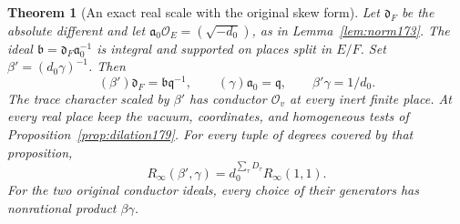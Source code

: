 \documentclass[a4paper,11pt]{article}
\newtheorem{theorem}[proposition]{Theorem}
\theoremstyle{definition}
\theoremstyle{remark}
\numberwithin{equation}{section}
\newcommand{\OO}{\mathcal O}
\begin{document}
\begin{theorem}[An exact real scale with the original skew form]
\label{thm:scale232}
Let \(\mathfrak d_F\) be the absolute different and let
\(\mathfrak a_0\OO_E=(\sqrt{-d_0})\), as in Lemma~\ref{lem:norm173}.
The ideal \(\mathfrak b=\mathfrak d_F\mathfrak a_0^{-1}\) is integral
and supported on places split in \(E/F\). Set
\(\beta'=(d_0\gamma)^{-1}\). Then
\[
  (\beta')\mathfrak d_F=\mathfrak b\mathfrak q^{-1},\qquad
  (\gamma)\mathfrak a_0=\mathfrak q,\qquad \beta'\gamma=1/d_0.
\]
The trace character scaled by \(\beta'\) has conductor \(\OO_v\) at
every inert finite place. At every real place keep the vacuum, coordinates,
and homogeneous tests of Proposition~\ref{prop:dilation179}. For every
tuple of degrees covered by that proposition,
\[
   R_\infty(\beta',\gamma)
             =d_0^{\sum_\tau D_\tau}R_\infty(1,1).
\]
For the two original conductor ideals, every choice of their generators
has nonrational product \(\beta\gamma\).
\end{theorem}
\end{document}
